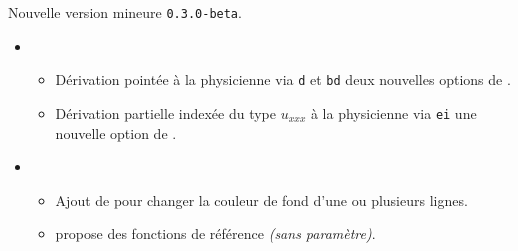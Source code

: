 Nouvelle version mineure \verb+0.3.0-beta+.

\begin{itemize}[itemsep=.5em]
    \item {}
    \begin{itemize}[itemsep=.5em]
        \item Dérivation pointée à la physicienne via \verb+d+ et \verb+bd+ deux nouvelles options de .

        \item Dérivation partielle indexée du type $u_{xxx}$ à la physicienne via \verb+ei+ une nouvelle option de .
    \end{itemize}



    \separation


    \item {}
    \begin{itemize}[itemsep=.5em]
        \item Ajout de  pour changer la couleur de fond d'une ou plusieurs lignes.


        \item {} propose des fonctions de référence \emph{(sans paramètre)}.
    \end{itemize}



    \separation
\end{itemize}
